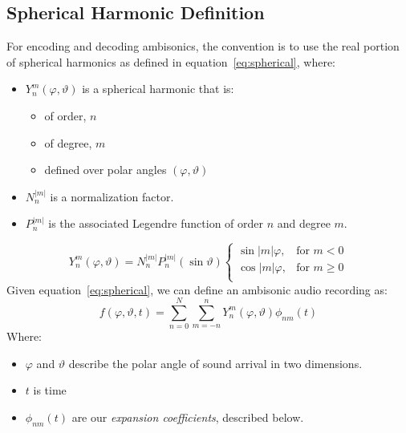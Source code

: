 \subsection{Spherical Harmonic Definition}
For encoding and decoding ambisonics, the convention is to use the
real portion of spherical harmonics as defined in
equation~\ref{eq:spherical}, where:
\begin{itemize}
\item $Y_{n}^{m}(\varphi,\vartheta)$ is a spherical harmonic that
is:
\begin{itemize}
\item of order, $n$
\item of degree, $m$
\item defined over polar angles $(\varphi, \vartheta)$
\end{itemize}
\item $N_n^{|m|}$ is a normalization factor.
\item $P_n^{|m|}$ is the associated Legendre function of order $n$
  and degree $m$.
\end{itemize}
\begin{equation}
Y_{n}^{m}(\varphi,\vartheta)=N_n^{|m|}P_n^{|m|}(\sin{\vartheta})
\begin{cases}\label{eq:spherical}
\sin{|m|\varphi},&  \text{for $m<0$}\\  
\cos{|m|\varphi},& \text{for $m\geq 0$}\\
\end{cases}
\end{equation}
Given equation~\ref{eq:spherical}, we can define an ambisonic
audio recording as:
\begin{equation}
f(\varphi,\vartheta,t)=\sum\limits_{n=0}^N\sum\limits_{m=-n}^nY_n^m(\varphi,\vartheta)\phi_{nm}(t)
\label{eq:ambisonics}
\end{equation}
Where:
\begin{itemize}
\item $\varphi$ and $\vartheta$ describe the polar angle of sound
  arrival in two dimensions.
\item $t$ is time
\item $\phi_{nm}(t)$ are our \textit{expansion coefficients}, described
  below.
\end{itemize}
